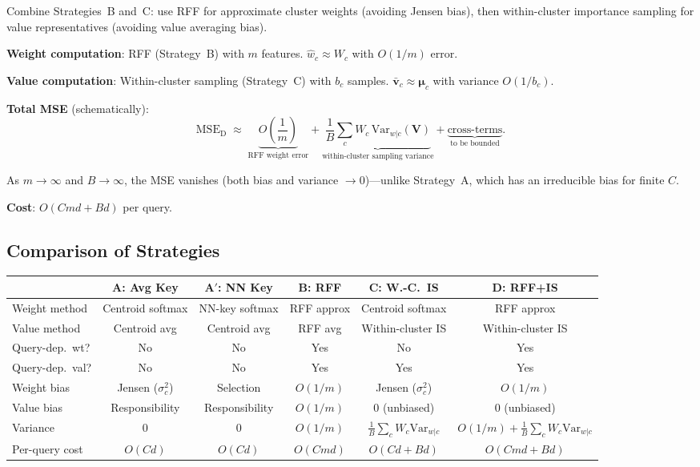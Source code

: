 \documentclass[11pt,a4paper]{article}
\theoremstyle{definition}
\newcommand{\vv}{\mathbf{v}}
\newcommand{\bmu}{\boldsymbol{\mu}}
\newcommand{\Var}{\mathrm{Var}}
\newcommand{\MSE}{\mathrm{MSE}}
\begin{document}
Combine Strategies~B and~C: use RFF for approximate cluster weights (avoiding
Jensen bias), then within-cluster importance sampling for value
representatives (avoiding value averaging bias).

\textbf{Weight computation}: RFF (Strategy~B) with $m$ features.
$\hat{w}_c \approx W_c$ with $O(1/m)$ error.

\textbf{Value computation}: Within-cluster sampling (Strategy~C) with $b_c$
samples.  $\bar{\vv}_c \approx \bmu_c$ with variance $O(1/b_c)$.

\textbf{Total MSE} (schematically):
\begin{equation}
  \MSE_{\mathrm{D}}
  \;\approx\;
  \underbrace{O\!\left(\frac{1}{m}\right)}_{\text{RFF weight error}}
  + \underbrace{\frac{1}{B}\sum_c W_c\,\Var_{w|c}(\mathbf{V})}
    _{\text{within-cluster sampling variance}}
  + \underbrace{\text{cross-terms}}_{\text{to be bounded}}.
\end{equation}

As $m\to\infty$ and $B\to\infty$, the MSE vanishes (both bias and variance
$\to 0$)---unlike Strategy~A, which has an irreducible bias for finite $C$.

\textbf{Cost}: $O(Cmd + Bd)$ per query.

\subsection{Comparison of Strategies}

\begin{center}
\small
\renewcommand{\arraystretch}{1.2}
\begin{tabular}{lccccc}
\toprule
& \textbf{A: Avg Key} & \textbf{A$'$: NN Key} & \textbf{B: RFF}
  & \textbf{C: W.-C.\ IS} & \textbf{D: RFF+IS}\\
\midrule
Weight method & Centroid softmax & NN-key softmax & RFF approx
  & Centroid softmax & RFF approx\\
Value method  & Centroid avg & Centroid avg & RFF avg
  & Within-cluster IS & Within-cluster IS\\
Query-dep.\ wt? & No & No & Yes & No & Yes\\
Query-dep.\ val? & No & No & Yes & Yes & Yes\\
Weight bias & Jensen ($\sigma_c^2$) & Selection & $O(1/m)$
  & Jensen ($\sigma_c^2$) & $O(1/m)$\\
Value bias  & Responsibility & Responsibility & $O(1/m)$
  & $0$ (unbiased) & $0$ (unbiased)\\
Variance    & $0$ & $0$ & $O(1/m)$
  & $\frac{1}{B}\sum_c W_c\Var_{w|c}$
  & $O(1/m) {+} \frac{1}{B}\sum_c W_c\Var_{w|c}$\\
Per-query cost & $O(Cd)$ & $O(Cd)$ & $O(Cmd)$
  & $O(Cd{+}Bd)$ & $O(Cmd{+}Bd)$\\
\bottomrule
\end{tabular}
\end{center}
\end{document}
